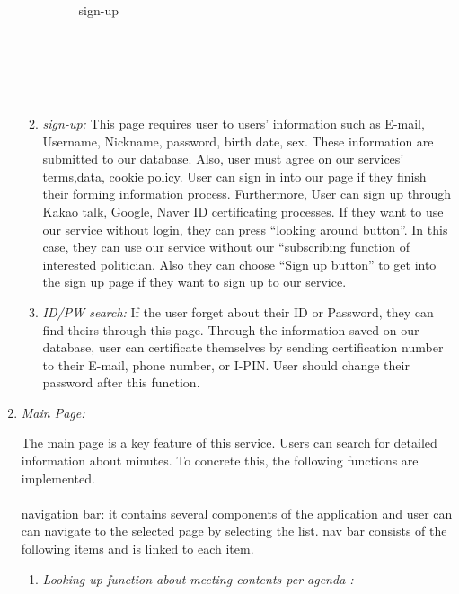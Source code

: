 \documentclass[conference]{IEEEtran}
\begin{document}
\begin{enumerate}
\begin{enumerate}
\begin{figure}[htbp]
	\caption{sign-up}
	\label{fig}
	\end{figure}
	\\
	\\
	\\
	\\
        \item \textit{sign-up: }This page requires user to users’ information  such as E-mail, Username, Nickname, password, birth date, sex. These information are submitted to our database. Also, user must agree on our services’ terms,data, cookie policy. User can sign in into our page if they finish their forming information process. Furthermore, User can sign up through Kakao talk, Google, Naver ID certificating processes. If they want to use our service without login, they can press “looking around button”. In this case, they can use our service without our “subscribing function of interested politician. Also they can choose “Sign up button” to get into the sign up page  if they want to sign up to our service.\\
         \item \textit{ID/PW search: }If the user forget about their ID or Password, they can find theirs through this page. Through the information saved on our database, user can certificate themselves by sending certification number to their E-mail,  phone number, or I-PIN. User should change their password after this function.\\
    \end{enumerate}
    
    \item \textit {Main Page: }
    
The main page is a key feature of this service. Users can search for detailed information about minutes. To concrete this, the following functions are implemented.\\
\\navigation bar: it contains several components of the application and user can can navigate to the selected page by selecting the list. nav bar consists of the following items and is linked to each item.\\
    \begin{enumerate}
    	\item \textit{Looking up function about meeting contents per agenda	:} \\
	
	     \begin{enumerate}
	     

\end{enumerate}
\end{enumerate}
\end{enumerate}
\end{document}
